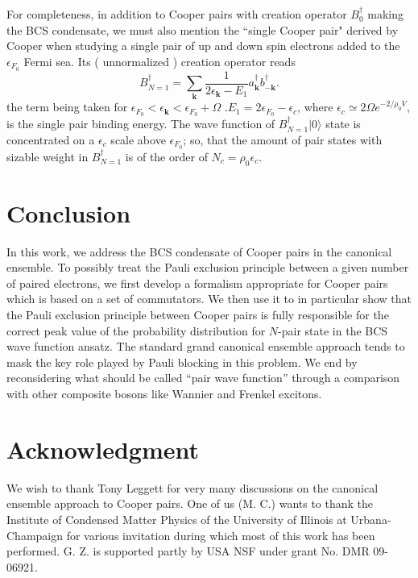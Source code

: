 \documentclass[twocolumn,showpacs]{revtex4}
\def\v#1{\mathbf{#1}}
\begin{document}
  For completeness, in addition to Cooper pairs with creation operator $B_0^\dag$ making the BCS condensate, we must  also mention the ``single Cooper pair" derived by Cooper when studying a single pair of up and down spin electrons added to the $\epsilon_{F_0}$ Fermi sea. Its ( unnormalized ) creation operator reads 
  \begin{equation}
B_{N=1}^\dag=\sum_{\v k}\frac{1}{2\epsilon_{\v k}-E_1}a_{\v k}^\dag b_{-\v k}^\dag.
\end{equation}
the term being taken for $\epsilon_{F_0}<\epsilon_{\v{k}}<\epsilon_{F_0}+\Omega$ .$E_1=2\epsilon_{F_0}-\epsilon_{c}$, where $\epsilon_{c}\simeq2\Omega e^{-2/\rho_0V}$, is the single pair binding energy. The wave function of $B_{N=1}^\dag|0\rangle$ state is concentrated on a $\epsilon_{c}$ scale above $\epsilon_{F_0}$; so, that the amount of pair states with sizable weight in $B_{N=1}^\dag$ is of the order of $N_c=\rho_0\epsilon_{c}$.
 
  
  \section{Conclusion}
 
 
In this work, we address the BCS condensate of Cooper pairs in the canonical ensemble. To possibly treat the Pauli exclusion principle between a given number of paired electrons, we first develop a formalism appropriate for Cooper pairs which is based on a set of commutators.  We then use it to in particular show that the Pauli exclusion principle between Cooper pairs is fully responsible for the correct peak value of the probability distribution for $N$-pair state in the BCS wave function ansatz. The standard grand canonical ensemble approach  tends to mask the key role played by Pauli blocking in this problem. We end by reconsidering what should be called ``pair wave function'' through a comparison with other composite bosons like Wannier and Frenkel excitons. 

\section{Acknowledgment}
We wish to thank Tony Leggett for very many discussions on the canonical ensemble approach to Cooper pairs. One of us (M. C.) wants to thank the Institute of Condensed Matter Physics of the University of Illinois at Urbana-Champaign for various invitation during which most of this work has been performed.  G. Z. is supported partly by USA NSF under grant No. DMR 09-06921. 
\end{document}
